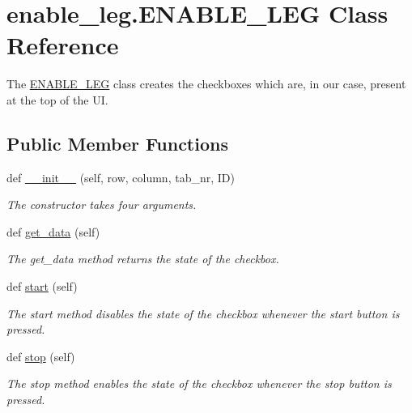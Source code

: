 \hypertarget{classenable__leg_1_1ENABLE__LEG}{}\section{enable\+\_\+leg.\+E\+N\+A\+B\+L\+E\+\_\+\+L\+EG Class Reference}
\label{classenable__leg_1_1ENABLE__LEG}


The \hyperlink{classenable__leg_1_1ENABLE__LEG}{E\+N\+A\+B\+L\+E\+\_\+\+L\+EG} class creates the checkboxes which are, in our case, present at the top of the UI.  


\subsection*{Public Member Functions}
\begin{DoxyCompactItemize}
\item 
def \hyperlink{classenable__leg_1_1ENABLE__LEG_afb85fe64a83ca61fa442d339076361db}{\+\_\+\+\_\+init\+\_\+\+\_\+} (self, row, column, tab\+\_\+nr, ID)
\begin{DoxyCompactList}\small\item\em The constructor takes four arguments. \end{DoxyCompactList}\item 
def \hyperlink{classenable__leg_1_1ENABLE__LEG_a14e5fcc56b5165f4afb0c8a65c944abc}{get\+\_\+data} (self)
\begin{DoxyCompactList}\small\item\em The get\+\_\+data method returns the state of the checkbox. \end{DoxyCompactList}\item 
def \hyperlink{classenable__leg_1_1ENABLE__LEG_ab234553de2df63591e215fe371ff6f77}{start} (self)
\begin{DoxyCompactList}\small\item\em The start method disables the state of the checkbox whenever the start button is pressed. \end{DoxyCompactList}\item 
def \hyperlink{classenable__leg_1_1ENABLE__LEG_a121e6b0432842f4250529f1b5c65ed63}{stop} (self)
\begin{DoxyCompactList}\small\item\em The stop method enables the state of the checkbox whenever the stop button is pressed. \end{DoxyCompactList}\end{DoxyCompactItemize}
